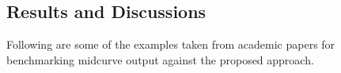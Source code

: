 
\subsection{Results and Discussions}

Following are some of the examples taken from academic papers for benchmarking midcurve output against the proposed approach.

\def\resultscasestablewidth{0.4}
%

